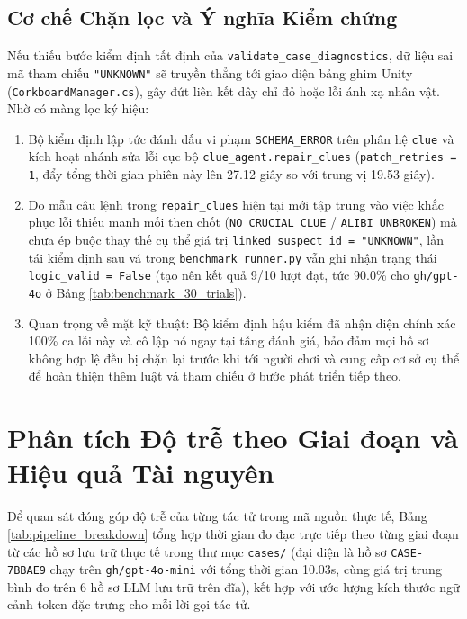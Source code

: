 \subsection{Cơ chế Chặn lọc và Ý nghĩa Kiểm chứng}
Nếu thiếu bước kiểm định tất định của \texttt{validate\_case\_diagnostics}, dữ liệu sai mã tham chiếu \texttt{"UNKNOWN"} sẽ truyền thẳng tới giao diện bảng ghim Unity (\texttt{CorkboardManager.cs}), gây đứt liên kết dây chỉ đỏ hoặc lỗi ánh xạ nhân vật. Nhờ có màng lọc ký hiệu:
\begin{enumerate}[leftmargin=1.5cm]
    \item Bộ kiểm định lập tức đánh dấu vi phạm \texttt{SCHEMA\_ERROR} trên phân hệ \texttt{clue} và kích hoạt nhánh sửa lỗi cục bộ \texttt{clue\_agent.repair\_clues} (\texttt{patch\_retries = 1}, đẩy tổng thời gian phiên này lên 27.12 giây so với trung vị 19.53 giây).
    \item Do mẫu câu lệnh trong \texttt{repair\_clues} hiện tại mới tập trung vào việc khắc phục lỗi thiếu manh mối then chốt (\texttt{NO\_CRUCIAL\_CLUE} / \texttt{ALIBI\_UNBROKEN}) mà chưa ép buộc thay thế cụ thể giá trị \texttt{linked\_suspect\_id = "UNKNOWN"}, lần tái kiểm định sau vá trong \texttt{benchmark\_runner.py} vẫn ghi nhận trạng thái \texttt{logic\_valid = False} (tạo nên kết quả 9/10 lượt đạt, tức 90.0\% cho \texttt{gh/gpt-4o} ở Bảng \ref{tab:benchmark_30_trials}).
    \item Quan trọng về mặt kỹ thuật: Bộ kiểm định hậu kiểm đã nhận diện chính xác 100\% ca lỗi này và cô lập nó ngay tại tầng đánh giá, bảo đảm mọi hồ sơ không hợp lệ đều bị chặn lại trước khi tới người chơi và cung cấp cơ sở cụ thể để hoàn thiện thêm luật vá tham chiếu ở bước phát triển tiếp theo.
\end{enumerate}

\section{Phân tích Độ trễ theo Giai đoạn và Hiệu quả Tài nguyên}
\label{sec:eval_cost_latency}

Để quan sát đóng góp độ trễ của từng tác tử trong mã nguồn thực tế, Bảng \ref{tab:pipeline_breakdown} tổng hợp thời gian đo đạc trực tiếp theo từng giai đoạn từ các hồ sơ lưu trữ thực tế trong thư mục \texttt{cases/} (đại diện là hồ sơ \texttt{CASE-7BBAE9} chạy trên \texttt{gh/gpt-4o-mini} với tổng thời gian 10.03s, cùng giá trị trung bình đo trên 6 hồ sơ LLM lưu trữ trên đĩa), kết hợp với ước lượng kích thước ngữ cảnh token đặc trưng cho mỗi lời gọi tác tử.

